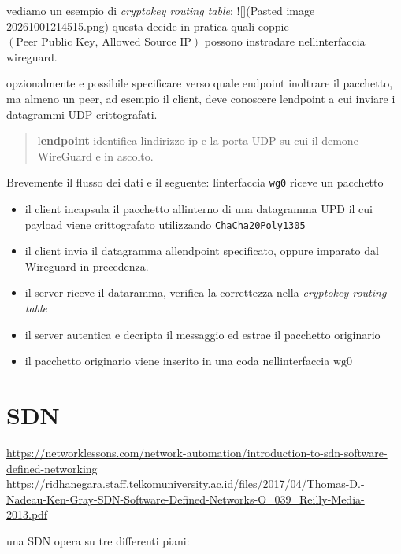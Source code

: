 vediamo un esempio di \emph{cryptokey routing table}: !{[}{]}(Pasted
image 20261001214515.png) questa decide in pratica quali coppie
\((\text{Peer Public Key, Allowed Source IP})\) possono instradare
nell\textquotesingle interfaccia wireguard.

opzionalmente e\textquotesingle{} possibile specificare verso quale
endpoint inoltrare il pacchetto, ma almeno un peer, ad esempio il
client, deve conoscere l\textquotesingle endpoint a cui inviare i
datagrammi UDP crittografati.

\begin{quote}
l\textquotesingle{}\textbf{endpoint} identifica
l\textquotesingle indirizzo ip e la porta UDP su cui il demone WireGuard
e\textquotesingle{} in ascolto.
\end{quote}

Brevemente il flusso dei dati e\textquotesingle{} il seguente:
l\textquotesingle interfaccia \passthrough{\lstinline!wg0!} riceve un
pacchetto

\begin{itemize}
\tightlist
\item
  il client incapsula il pacchetto all\textquotesingle interno di una
  datagramma UPD il cui payload viene crittografato utilizzando
  \passthrough{\lstinline!ChaCha20Poly1305!}
\item
  il client invia il datagramma all\textquotesingle endpoint
  specificato, oppure imparato dal Wireguard in precedenza.
\item
  il server riceve il dataramma, verifica la correttezza nella
  \emph{cryptokey routing table}
\item
  il server autentica e decripta il messaggio ed estrae il pacchetto
  originario
\item
  il pacchetto originario viene inserito in una coda
  nell\textquotesingle interfaccia \(\text{wg}0\)
\end{itemize}

\section{SDN}\label{sdn}

\url{https://networklessons.com/network-automation/introduction-to-sdn-software-defined-networking}
\url{https://ridhanegara.staff.telkomuniversity.ac.id/files/2017/04/Thomas-D.-Nadeau-Ken-Gray-SDN-Software-Defined-Networks-O_039_Reilly-Media-2013.pdf}

una SDN opera su tre differenti piani:

